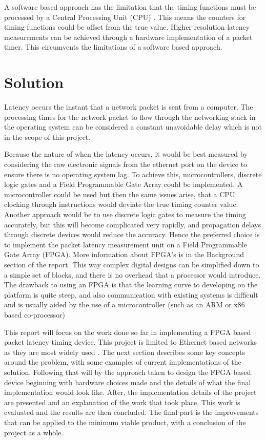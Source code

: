 \par A software based approach has the limitation that the timing functions must be processed by a
Central Processing Unit (CPU) \cite{CPUtiming}. This means the counters for timing functions could be offset from the true value. Higher
resolution latency measurements can be achieved through a hardware implementation of a packet
timer. This circumvents the limitations of a software based approach.

\section{Solution}

Latency occurs the instant that a network packet is sent from a computer. The processing times for the network packet
to flow through the networking stack in the operating system can be considered a constant unavoidable delay which is
not in the scope of this project.

Because the nature of when the latency occurs, it would be best measured by considering the raw electronic signals 
from the ethernet port on the device to ensure there is no operating system lag. To achieve this, microcontrollers, 
discrete logic gates and a Field Programmable Gate Array could be implemented. A microcontroller could be used but 
then the same issues arise, that a CPU clocking through instructions would deviate the true timing counter value. 
Another approach would be to use discrete logic gates to measure the timing accurately, but this will become 
complicated very rapidly, and propagation delays through discrete devices would reduce the accuracy. Hence the 
preferred choice is to implement the packet latency measurement unit on a Field Programmable Gate Array (FPGA). More 
information about FPGA’s is in the Background section of the report. This way complex digital designs can be 
simplified down to a simple set of blocks, and there is no overhead that a processor would introduce. The drawback 
to using an FPGA is that the learning curve to developing on the platform is quite steep, and also communication 
with existing systems is difficult and is usually aided by the use of a microcontroller (such as an ARM or x86 based 
co-processor)

\par This report will focus on the work done so far in implementing a FPGA based packet latency timing
device. This project is limited to Ethernet based networks as they are most widely used \cite{etherneteverywhere}.
The next section describes some key concepts around the problem, with some examples of current implementations of the
solution. Following that will by the approach taken to design the FPGA based device beginning with hardware choices
made and the details of what the final implementation would look like. After, the implementation details of the 
project are presented and an explanation of the work that took place. This work is evaluated and the results are then
concluded. The final part is the improvements that can be applied to the minimum viable product, with a conclusion of
the project as a whole.
